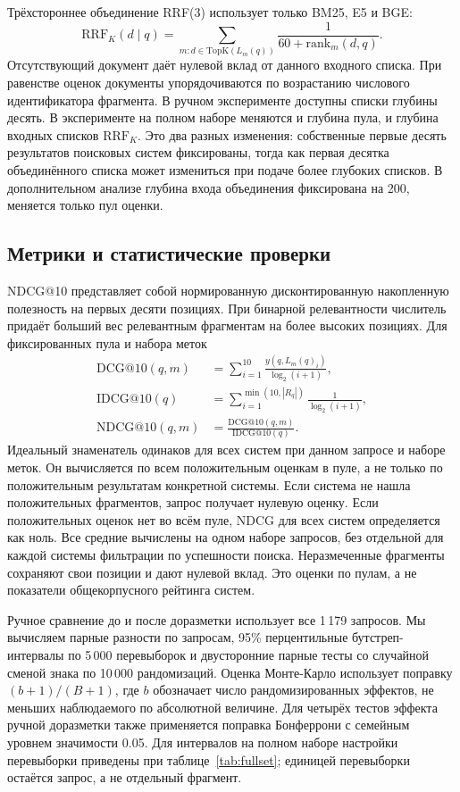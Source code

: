 \documentclass[runningheads,a4paper]{llncs}
\begin{document}
Трёхстороннее объединение RRF(3) использует только BM25, E5 и BGE:
\begin{equation}
\mathrm{RRF}_K(d\mid q)=\sum_{m:d\in\mathrm{TopK}(L_m(q))}\frac{1}{60+\mathrm{rank}_m(d,q)}.
\label{eq:rrf}
\end{equation}
Отсутствующий документ даёт нулевой вклад от данного входного списка. При равенстве оценок документы упорядочиваются по возрастанию числового идентификатора фрагмента. В ручном эксперименте доступны списки глубины десять. В эксперименте на полном наборе меняются и глубина пула, и глубина входных списков \(\mathrm{RRF}_K\). Это два разных изменения: собственные первые десять результатов поисковых систем фиксированы, тогда как первая десятка объединённого списка может измениться при подаче более глубоких списков. В дополнительном анализе глубина входа объединения фиксирована на 200, меняется только пул оценки.

\subsection{Метрики и статистические проверки}
\label{sec:metrics}

NDCG@10 представляет собой нормированную дисконтированную накопленную полезность на первых десяти позициях. При бинарной релевантности числитель придаёт больший вес релевантным фрагментам на более высоких позициях. Для фиксированных пула и набора меток
\begin{align}
\mathrm{DCG}@10(q,m)&=\sum_{i=1}^{10}\frac{y(q,L_m(q)_i)}{\log_2(i+1)},\\
\mathrm{IDCG}@10(q)&=\sum_{i=1}^{\min(10,|R_q|)}\frac{1}{\log_2(i+1)},\\
\mathrm{NDCG}@10(q,m)&=\frac{\mathrm{DCG}@10(q,m)}{\mathrm{IDCG}@10(q)}.
\label{eq:ndcg}
\end{align}
Идеальный знаменатель одинаков для всех систем при данном запросе и наборе меток. Он вычисляется по всем положительным оценкам в пуле, а не только по положительным результатам конкретной системы. Если система не нашла положительных фрагментов, запрос получает нулевую оценку. Если положительных оценок нет во всём пуле, NDCG для всех систем определяется как ноль. Все средние вычислены на одном наборе запросов, без отдельной для каждой системы фильтрации по успешности поиска. Неразмеченные фрагменты сохраняют свои позиции и дают нулевой вклад. Это оценки по пулам, а не показатели общекорпусного рейтинга систем.

Ручное сравнение до и после доразметки использует все 1\,179 запросов. Мы вычисляем парные разности по запросам, 95\% перцентильные бутстреп-интервалы по 5\,000 перевыборок и двусторонние парные тесты со случайной сменой знака по 10\,000 рандомизаций. Оценка Монте-Карло использует поправку \((b+1)/(B+1)\), где \(b\) обозначает число рандомизированных эффектов, не меньших наблюдаемого по абсолютной величине. Для четырёх тестов эффекта ручной доразметки также применяется поправка Бонферрони с семейным уровнем значимости 0.05. Для интервалов на полном наборе настройки перевыборки приведены при таблице~\ref{tab:fullset}; единицей перевыборки остаётся запрос, а не отдельный фрагмент.
\end{document}
